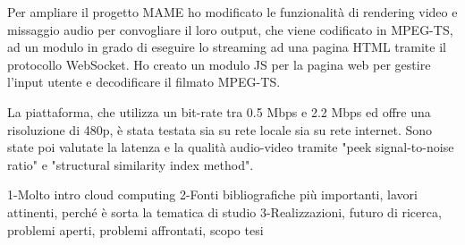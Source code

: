 Per ampliare il progetto MAME ho modificato le funzionalità di rendering video e missaggio audio per convogliare il loro output, che viene codificato in MPEG-TS, ad un modulo in grado di eseguire lo streaming ad una pagina HTML tramite il protocollo WebSocket. Ho creato un modulo JS per la pagina web per gestire l'input utente e decodificare il filmato MPEG-TS.

La piattaforma, che utilizza un bit-rate tra 0.5 Mbps e 2.2 Mbps ed offre una risoluzione di 480p, è stata testata sia su rete locale sia su rete internet. Sono state poi valutate la latenza e la qualità audio-video tramite "peek signal-to-noise ratio" e "structural similarity index method".



1-Molto intro cloud computing
2-Fonti bibliografiche più importanti, lavori attinenti, perché è sorta la tematica di studio
3-Realizzazioni, futuro di ricerca, problemi aperti, problemi affrontati, scopo tesi


